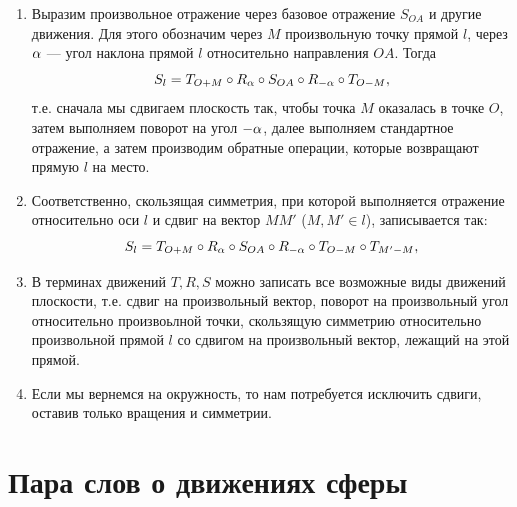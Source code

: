 \begin{enumerate}
\item Выразим произвольное отражение через базовое отражение $S_{OA}$ и другие движения. Для этого обозначим через $M$  произвольную точку прямой $l$, через $\alpha$ --- угол наклона прямой $l$ относительно направления $OA$. Тогда
$$
S_l = T_{O+M}\circ R_\alpha \circ S_{OA} \circ R_{-\alpha}\circ T_{O-M},
$$
т.е. сначала мы сдвигаем плоскость так, чтобы точка $M$ оказалась в точке $O$, затем выполняем поворот на угол $-\alpha$, далее выполняем стандартное отражение, а затем производим обратные операции, которые возвращают прямую $l$ на место.
\item Соответственно, скользящая симметрия, при которой выполняется отражение относительно оси $l$ и сдвиг на вектор $MM'$ ($M,M'\in l$), записывается так:
$$
S_l = T_{O+M}\circ R_\alpha \circ S_{OA} \circ R_{-\alpha}\circ T_{O-M}\circ T_{M'-M},
$$
\item В терминах движений $T,R,S$ можно записать все возможные виды движений плоскости, т.е. сдвиг на произвольный вектор, поворот на произвольный угол относительно произвоьлной точки, скользящую симметрию относительно произвольной прямой $l$ со сдвигом на произвольный вектор, лежащий на этой прямой.
\item Если мы вернемся на окружность, то нам потребуется исключить сдвиги, оставив только вращения и симметрии.
\end{enumerate}









\section{Пара слов о движениях сферы}
